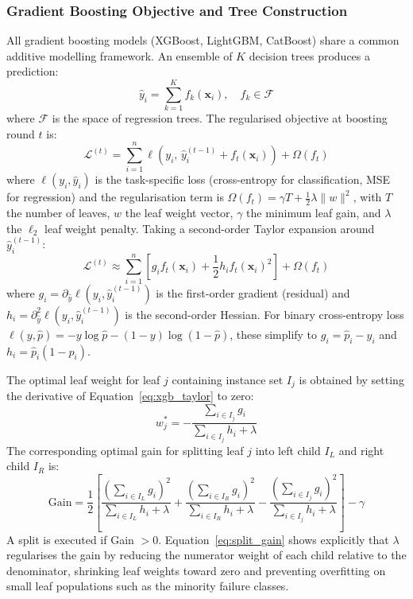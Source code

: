 \subsubsection{Gradient Boosting Objective and Tree Construction}

All gradient boosting models (XGBoost, LightGBM, CatBoost) share a common additive modelling framework. An ensemble of $K$ decision trees produces a prediction:
\begin{equation}
    \hat{y}_i = \sum_{k=1}^{K} f_k(\mathbf{x}_i), \quad f_k \in \mathcal{F}
    \label{eq:gb_ensemble}
\end{equation}
where $\mathcal{F}$ is the space of regression trees. The regularised objective at boosting round $t$ is:
\begin{equation}
    \mathcal{L}^{(t)} = \sum_{i=1}^{n} \ell\!\left(y_i,\, \hat{y}_i^{(t-1)} + f_t(\mathbf{x}_i)\right) + \Omega(f_t)
    \label{eq:xgb_obj}
\end{equation}
where $\ell(y_i, \hat{y}_i)$ is the task-specific loss (cross-entropy for classification, MSE for regression) and the regularisation term is $\Omega(f_t) = \gamma T + \frac{1}{2}\lambda \|w\|^2$, with $T$ the number of leaves, $w$ the leaf weight vector, $\gamma$ the minimum leaf gain, and $\lambda$ the $\ell_2$ leaf weight penalty. Taking a second-order Taylor expansion around $\hat{y}^{(t-1)}_i$:
\begin{equation}
    \mathcal{L}^{(t)} \approx \sum_{i=1}^{n} \left[ g_i f_t(\mathbf{x}_i) + \frac{1}{2} h_i f_t(\mathbf{x}_i)^2 \right] + \Omega(f_t)
    \label{eq:xgb_taylor}
\end{equation}
where $g_i = \partial_{\hat{y}} \ell(y_i, \hat{y}^{(t-1)}_i)$ is the first-order gradient (residual) and $h_i = \partial^2_{\hat{y}} \ell(y_i, \hat{y}^{(t-1)}_i)$ is the second-order Hessian. For binary cross-entropy loss $\ell(y,\hat{p}) = -y\log\hat{p} - (1-y)\log(1-\hat{p})$, these simplify to $g_i = \hat{p}_i - y_i$ and $h_i = \hat{p}_i(1-\hat{p}_i)$.

The optimal leaf weight for leaf $j$ containing instance set $I_j$ is obtained by setting the derivative of Equation~\ref{eq:xgb_taylor} to zero:
\begin{equation}
    w_j^* = -\frac{\sum_{i \in I_j} g_i}{\sum_{i \in I_j} h_i + \lambda}
    \label{eq:optimal_leaf}
\end{equation}
The corresponding optimal gain for splitting leaf $j$ into left child $I_L$ and right child $I_R$ is:
\begin{equation}
    \text{Gain} = \frac{1}{2}\left[
        \frac{\left(\sum_{i \in I_L} g_i\right)^2}{\sum_{i \in I_L} h_i + \lambda}
        + \frac{\left(\sum_{i \in I_R} g_i\right)^2}{\sum_{i \in I_R} h_i + \lambda}
        - \frac{\left(\sum_{i \in I_j} g_i\right)^2}{\sum_{i \in I_j} h_i + \lambda}
    \right] - \gamma
    \label{eq:split_gain}
\end{equation}
A split is executed if Gain $> 0$. Equation~\ref{eq:split_gain} shows explicitly that $\lambda$ regularises the gain by reducing the numerator weight of each child relative to the denominator, shrinking leaf weights toward zero and preventing overfitting on small leaf populations such as the minority failure classes.

